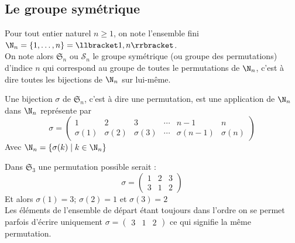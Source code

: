 \subsection{Le groupe symétrique}
\begin{defini}
Pour tout entier naturel $n\geq 1$, on note l'ensemble fini $\N_n=\{1,\dots,n\}=\llbracket 1,n \rrbracket$.\\ On note alors $\mathfrak{S}_n$ ou $\mathcal{S}_n$ le groupe symétrique (ou groupe des permutations) d'indice $n$ qui correspond au groupe de toutes le permutations de $\N_n$, c'est à dire toutes les bijections de $\N_n$ sur lui-même.
\end{defini}

Une bijection $\sigma$ de $\mathfrak{S}_n$, c'est à dire une permutation, est une application de $\N_n$ dans $\N_n$ représente par \[
\sigma = 
\begin{pmatrix}
    1 & 2 & 3 & \cdots & n-1 & n \\
    \sigma(1) & \sigma(2) & \sigma(3) & \cdots &  \sigma(n-1)  & \sigma(n)
\end{pmatrix}
\]
Avec $\N_n=\{\sigma(k)\mid k\in \N_n\}$\\

\begin{ex}Dans $\mathfrak{S}_3$ une permutation possible serait :	
\[
\sigma = 
\begin{pmatrix}
    1 & 2 & 3 \\
    3 & 1 & 2
\end{pmatrix}
\]
Et alors $\sigma(1)=3$; $\sigma(2)=1$ et $\sigma(3)=2$\\
Les éléments de l'ensemble de départ étant toujours dans l'ordre on se permet parfois d'écrire uniquement $\sigma=	\begin{pmatrix}
    3 & 1 & 2
\end{pmatrix}$ ce qui signifie la même permutation.
\end{ex}


